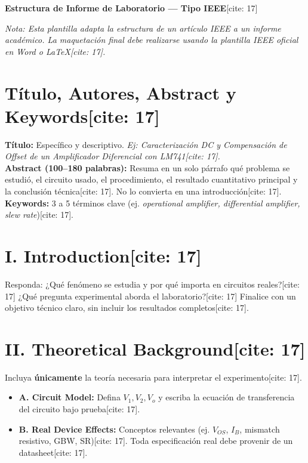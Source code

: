 \documentclass[11pt, a4paper]{article}
\begin{document}
\begin{center}
    \Large\textbf{\textcolor{ucbblue}{Estructura de Informe de Laboratorio — Tipo IEEE}}[cite: 17]
\end{center}

\textit{Nota: Esta plantilla adapta la estructura de un artículo IEEE a un informe académico. La maquetación final debe realizarse usando la plantilla IEEE oficial en Word o LaTeX[cite: 17].}

\section*{Título, Autores, Abstract y Keywords[cite: 17]}
\textbf{Título:} Específico y descriptivo. \textit{Ej: Caracterización DC y Compensación de Offset de un Amplificador Diferencial con LM741[cite: 17].} \\
\textbf{Abstract (100–180 palabras):} Resuma en un solo párrafo qué problema se estudió, el circuito usado, el procedimiento, el resultado cuantitativo principal y la conclusión técnica[cite: 17]. No lo convierta en una introducción[cite: 17]. \\
\textbf{Keywords:} 3 a 5 términos clave (ej. \textit{operational amplifier, differential amplifier, slew rate})[cite: 17].

\section*{I. Introduction[cite: 17]}
Responda: ¿Qué fenómeno se estudia y por qué importa en circuitos reales?[cite: 17] ¿Qué pregunta experimental aborda el laboratorio?[cite: 17] Finalice con un objetivo técnico claro, sin incluir los resultados completos[cite: 17].

\section*{II. Theoretical Background[cite: 17]}
Incluya \textbf{únicamente} la teoría necesaria para interpretar el experimento[cite: 17].
\begin{itemize}
    \item \textbf{A. Circuit Model:} Defina $V_1, V_2, V_o$ y escriba la ecuación de transferencia del circuito bajo prueba[cite: 17].
    \item \textbf{B. Real Device Effects:} Conceptos relevantes (ej. $V_{OS}$, $I_B$, mismatch resistivo, GBW, SR)[cite: 17]. Toda especificación real debe provenir de un datasheet[cite: 17].
\end{itemize}
\end{document}
